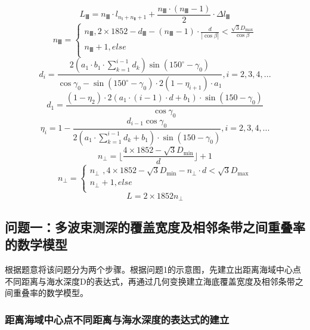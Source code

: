 \documentclass[withoutpreface,bwprint]{cumcmthesis} %
\begin{document}
$$
L_Ⅲ=n_Ⅲ\cdot l_{n_Ⅰ+n_Ⅱ+1}+\frac{n_Ⅲ\cdot \left( n_Ⅲ-1 \right)}{2}\cdot \varDelta l_Ⅲ
$$
$$
n_Ⅲ=\begin{cases}
	n_Ⅲ, 2\times 1852-d_Ⅲ-\left( n_Ⅲ-1 \right) \cdot \frac{d}{\left| \cos \beta \right|}<\frac{\sqrt{3}D_{\max}}{\cos \beta}\\
	n_Ⅲ+1, else\\
\end{cases}
$$
$$
d_i=\frac{2\left( a_1\cdot b_1\cdot \sum_{k=1}^{i-1}{d_k} \right) \sin \left( 150^{\circ}-\gamma _0 \right)}{\cos \gamma _0-\sin \left( 150^{\circ}-\gamma _0 \right) \cdot 2\left( 1-\eta _{i+1} \right) \cdot a_1},i=2,3,4,...
$$
$$
d_1=\frac{\left( 1-\eta _2 \right) \cdot 2\left( a_1\cdot \left( i-1 \right) \cdot d+b_1 \right) \cdot \sin \left( 150-\gamma _0 \right)}{\cos \gamma _0}
$$
$$
\eta _i=1-\frac{d_{i-1}\cos \gamma _0}{2\left( a_1\cdot \sum_{k=1}^{i-1}{d_k}+b_1 \right) \cdot \sin \left( 150-\gamma _0 \right)},i=2,3,4,...
$$
$$
n_{\bot}=\lfloor \frac{4\times 1852-\sqrt{3}D_{\min}}{d} \rfloor +1
$$
$$
n_{\bot}=\begin{cases}
	n_{\bot}\,\,, 4\times 1852-\sqrt{3}D_{\min}-n_{\bot}\cdot d<\sqrt{3}D_{\max}\\
	n_{\bot}+1, else\\
\end{cases}
$$
$$
L=2\times 1852n_{\bot}
$$
\subsection{问题一：多波束测深的覆盖宽度及相邻条带之间重叠率的数学模型}
根据题意将该问题分为两个步骤。根据问题1的示意图，先建立出距离海域中心点不同距离与海水深度D的表达式，再通过几何变换建立海底覆盖宽度及相邻条带之间重叠率的数学模型。
\subsubsection{距离海域中心点不同距离与海水深度的表达式的建立}
\end{document}
